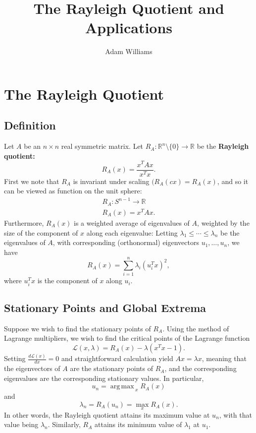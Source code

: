 \documentclass[reqno]{amsart}
\title{The Rayleigh Quotient and Applications}
\author{Adam Williams}
\DeclareMathOperator*{\argmax}{arg\,max\,}
\numberwithin{equation}{section}
\begin{document}
\maketitle

\section{The Rayleigh Quotient}

\subsection{Definition}

Let $A$ be an $n \times n$ real symmetric matrix.
Let $R_A : \mathbb R^n \setminus \{0\} \to \mathbb R$ be the \textbf{Rayleigh
quotient:}
$$
    R_A(x) = \frac{x^T Ax}{x^T x}.
$$
First we note that $R_A$ is invariant under scaling $(R_A(cx) = R_A(x)$, and so
it can be viewed as function on the unit sphere:
\begin{align*}
    R_A : S^{n-1} \to \mathbb{R} \\
    R_A(x) = x^T A x.
\end{align*}
Furthermore, $R_A(x)$ is a weighted average of eigenvalues of $A$, weighted by
the size of the component of $x$ along each eigenvalue: Letting $\lambda_1
\le \cdots \le \lambda_n$ be the eigenvalues of $A$, with corresponding
(orthonormal) eigenvectors $u_1, \ldots, u_n$, we have
\begin{equation}
    R_A(x) = \sum_{i=1}^n \lambda_i (u_i^T x)^2,
\label{eigen}
\end{equation}
where $u_i^Tx$ is the component of $x$ along $u_i$.

\subsection{Stationary Points and Global Extrema}

Suppose we wish to find the stationary points of $R_A$.
Using the method of Lagrange multipliers,
we wish to find the critical points of the Lagrange function
$$
    \mathcal L(x, \lambda) = R_A(x) - \lambda (x^T x - 1).
$$
Setting $\frac{ d \mathcal L(x)}{d x} = 0$ and straightforward calculation
yield $Ax = \lambda x$, meaning that the eigenvectors of $A$ are the
stationary points of $R_A$, and the corresponding eigenvalues are
the corresponding stationary values. In particular,
$$
    u_n = \argmax_x R_A(x)
$$
and
$$
    \lambda_n = R_A(u_n) = \max_x R_A(x).
$$
In other words, the Rayleigh quotient attains its maximum value at $u_n$,
with that value being $\lambda_n$. Similarly, $R_A$ attains its minimum
value of $\lambda_1$ at $u_1$.
\end{document}
